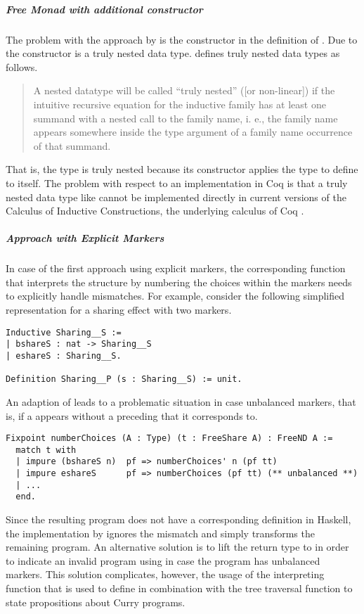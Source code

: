 \subparagraph{Free Monad with additional constructor}
The problem with the approach by \citeauthor{pirog2018syntax} is the  constructor in the definition of .
Due to the  constructor  is a truly nested data type.
\citet{matthes2008recursion} defines truly nested data types as follows.

\begin{quote}
A nested datatype will be called “truly nested” ([or non-linear]) if the intuitive recursive equation for the inductive family has at least one summand with a nested call to the family name, i. e., the family name appears somewhere inside the type argument of a family name occurrence of that summand.
\end{quote}

That is, the type  is truly nested because its constructor  applies the type to define to itself.
The problem with respect to an implementation in Coq is that a truly nested data type like  cannot be implemented directly in current versions of the Calculus of Inductive Constructions, the underlying calculus of Coq \citep{matthes2008recursion}.

\subparagraph{Approach with Explicit Markers}
In case of the first approach using explicit markers, the corresponding function that interprets the  structure by numbering the choices within the markers needs to explicitly handle mismatches.
For example, consider the following simplified representation for a sharing effect with two markers.

\begin{verbatim}
Inductive Sharing__S :=
| bshareS : nat -> Sharing__S
| eshareS : Sharing__S.

Definition Sharing__P (s : Sharing__S) := unit.
\end{verbatim}

An adaption of  leads to a problematic situation in case unbalanced markers, that is, if a  appears without a preceding  that it corresponds to.

\begin{verbatim}
Fixpoint numberChoices (A : Type) (t : FreeShare A) : FreeND A :=
  match t with
  | impure (bshareS n)  pf => numberChoices' n (pf tt)
  | impure eshareS      pf => numberChoices (pf tt) (** unbalanced **)
  | ...
  end.
\end{verbatim}

Since the resulting program does not have a corresponding definition in Haskell, the implementation by \citeauthor{bunkenburg2019modeling} ignores the mismatch and simply transforms the remaining program.
An alternative solution is to lift the return type to  in order to indicate an invalid program using  in case the program has unbalanced markers.
This solution complicates, however, the usage of the interpreting function  that is used to define in combination with the tree traversal function  to state propositions about Curry programs.


